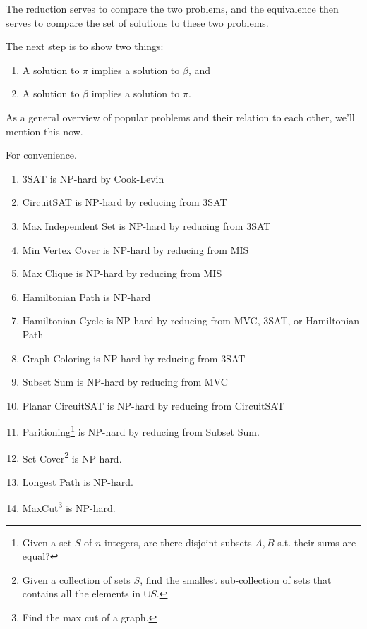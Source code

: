   The reduction serves to compare the two problems, and the equivalence then serves to compare the set of solutions to these two problems.   

  \begin{definition}
    \label{def:equivalence-of-solutions}
    The next step is to show two things: 
    \begin{enumerate}
      \item A solution to $\pi$ implies a solution to $\beta$, and 
      \item A solution to $\beta$ implies a solution to $\pi$. 
    \end{enumerate}
  \end{definition} 

  As a general overview of popular problems and their relation to each other, we'll mention this now. 

  \begin{theorem}
    \label{thm:reduction-tree-of-np-hard-problems}
    For convenience. 
    \begin{enumerate}
      \item 3SAT is NP-hard by Cook-Levin 
      \item CircuitSAT is NP-hard by reducing from 3SAT 
      \item Max Independent Set is NP-hard by reducing from 3SAT 
      \item Min Vertex Cover is NP-hard by reducing from MIS 
      \item Max Clique is NP-hard by reducing from MIS \label{max-clique-np-hard}
      \item Hamiltonian Path is NP-hard 
      \item Hamiltonian Cycle is NP-hard by reducing from MVC, 3SAT, or Hamiltonian Path 
      \item Graph Coloring is NP-hard by reducing from 3SAT 
      \item Subset Sum is NP-hard by reducing from MVC 
      \item Planar CircuitSAT is NP-hard by reducing from CircuitSAT 
      \item Paritioning\footnote{Given a set $S$ of $n$ integers, are there disjoint subsets $A, B$ s.t. their sums are equal?} is NP-hard by reducing from Subset Sum. 
      \item Set Cover\footnote{Given a collection of sets $S$, find the smallest sub-collection of sets that contains all the elements in $\cup S$.} is NP-hard. 
      \item Longest Path is NP-hard. 
      \item MaxCut\footnote{Find the max cut of a graph.} is NP-hard. 
    \end{enumerate}
  \end{theorem}

